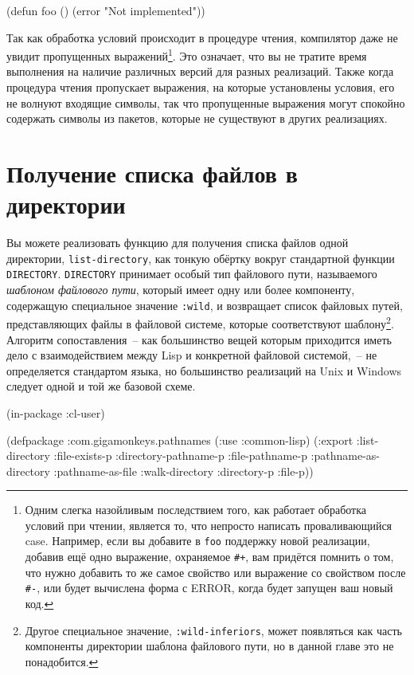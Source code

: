 \begin{myverb}
(defun foo ()
  (error "Not implemented"))
\end{myverb}

Так как обработка условий происходит в процедуре чтения, компилятор даже не увидит пропущенных
выражений\footnote{Одним слегка назойливым последствием того, как работает обработка
  условий при чтении, является то, что непросто написать проваливающийся case. Например,
  если вы добавите в \lstinline{foo} поддержку новой реализации, добавив ещё одно выражение,
  охраняемое \lstinline!#+!, вам придётся помнить о том, что нужно добавить то же самое
  свойство или выражение со свойством после \lstinline!#-!, или будет вычислена форма с
  ERROR, когда будет запущен ваш новый код.}. Это означает, что вы не тратите время
выполнения на наличие различных версий для разных реализаций. Также когда процедура чтения
пропускает выражения, на которые установлены условия, его не волнуют входящие символы, так
что пропущенные выражения могут спокойно содержать символы из пакетов, которые не
существуют в других реализациях.

\section{Получение списка файлов в директории}

Вы можете реализовать функцию для получения списка файлов одной директории,
\lstinline{list-directory}, как тонкую обёртку вокруг стандартной функции
\lstinline{DIRECTORY}. \lstinline{DIRECTORY} принимает особый тип файлового пути,
называемого \textit{шаблоном файлового пути}, который имеет одну или более компоненту,
содержащую специальное значение \lstinline{:wild}, и возвращает список файловых путей,
представляющих файлы в файловой системе, которые соответствуют шаблону\footnote{Другое
  специальное значение, \lstinline{:wild-inferiors}, может появляться как часть компоненты
  директории шаблона файлового пути, но в данной главе это не понадобится.}. Алгоритм
сопоставления~-- как большинство вещей которым приходится иметь дело с взаимодействием
между Lisp и конкретной файловой системой,~-- не определяется стандартом языка, но
большинство реализаций на Unix и Windows следует одной и той же базовой схеме.

\begin{lrbox}{\chonefiveone}
  \begin{minipage}{\linewidth}
\begin{myverb}
(in-package :cl-user)

(defpackage :com.gigamonkeys.pathnames
  (:use :common-lisp)
  (:export
   :list-directory
   :file-exists-p
   :directory-pathname-p
   :file-pathname-p
   :pathname-as-directory
   :pathname-as-file
   :walk-directory
   :directory-p
   :file-p))
\end{myverb}
  \end{minipage}
\end{lrbox}



